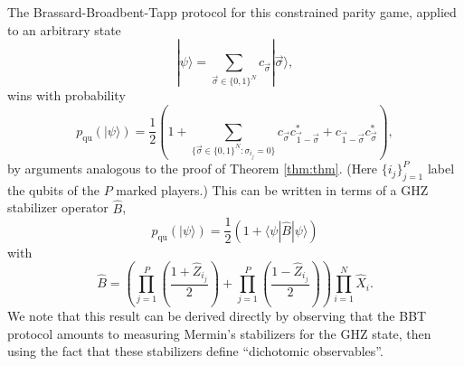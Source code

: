 \documentclass[prb,twocolumn,showpacs,amssymb,superscriptaddress]{revtex4-2}
\begin{document}
The Brassard-Broadbent-Tapp protocol for this constrained parity game, applied to an arbitrary state
\begin{equation}
|\psi\rangle = \sum_{\vec{\sigma}\in\{0,1\}^N} c_{\vec{\sigma}} |\vec{\sigma}\rangle,
\end{equation}
wins with probability
\begin{equation}
\label{eq:exactP}
p_{\mathrm{qu}}(|\psi\rangle) = \frac{1}{2}\left(1+ \sum_{\{\vec{\sigma}\in\{0,1\}^N:\sigma_{i_j} = 0\}} c_{\vec{\sigma}}c^*_{\vec{1}-\vec{\sigma}} + c_{\vec{1}-\vec{\sigma}}c^*_{\vec{\sigma}} \right),
\end{equation}
by arguments analogous to the proof of Theorem \ref{thm:thm}. (Here $\{i_j\}_{j=1}^P$ label the qubits of the $P$ marked players.) This can be written in terms of a GHZ stabilizer operator $\hat{B}$,
\begin{equation}
p_{\mathrm{qu}}(|\psi\rangle) = \frac{1}{2}\left(1+ \langle \psi| \hat{B}|\psi\rangle \right)
\end{equation}
with
\begin{equation}
\hat{B} = \left(\prod_{j=1}^P \left(\frac{1+\hat{Z}_{i_j}}{2}\right) + \prod_{j=1}^P \left(\frac{1-\hat{Z}_{i_j}}{2}\right)\right) \prod_{i=1}^N \hat{X}_i.
\end{equation}
We note that this result can be derived directly by observing that the BBT protocol amounts to measuring Mermin's stabilizers for the GHZ state\cite{mermin1990extreme}, then using the fact that these stabilizers define ``dichotomic observables''\cite{DanielMiyake}.
\end{document}
